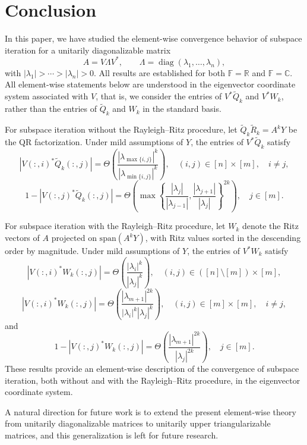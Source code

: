 \documentclass[11pt,a4paper]{article}
\theoremstyle{plain}              %
\theoremstyle{definition}         %
\begin{document}
\section{Conclusion}\label{section:conclusion}

In this paper, we have studied the element-wise convergence behavior of subspace iteration for a unitarily diagonalizable matrix
\[
A = V \Lambda V^*, \qquad \Lambda = \operatorname{diag}(\lambda_1,\dots,\lambda_n),
\]
with \(|\lambda_1| > \cdots > |\lambda_n| > 0\). All results are established for both \(\mathbb{F} = \mathbb{R}\) and \(\mathbb{F} = \mathbb{C}\). All element-wise statements below are understood in the eigenvector coordinate system associated with \(V\), that is, we consider the entries of \(V^*\tilde Q_k\) and \(V^*W_k\), rather than the entries of \(\tilde Q_k\) and \(W_k\) in the standard basis.

For subspace iteration without the Rayleigh--Ritz procedure, let \(\tilde Q_k \tilde R_k = A^k Y\) be the QR factorization. Under mild assumptions of \(Y\), the entries of \(V^*\tilde Q_k\) satisfy
\[
|V(:,i)^*\tilde Q_k(:,j)|=\Theta \left(\frac{|\lambda_{\max\{i,j\}}|^k}{|\lambda_{\min\{i,j\}}|^k}\right), \quad (i,j)\in[n]\times [m],\quad i\neq j,
\]
\[
1-|V(:,j)^*\tilde Q_k(:,j)|=\Theta\left( \max\left\{\frac{|\lambda_j|}{|\lambda_{j-1}|}, \frac{|\lambda_{j+1}|}{|\lambda_j|}\right\}^{2k}\right),\quad j\in[m].
\]

For subspace iteration with the Rayleigh--Ritz procedure, let \(W_k\) denote the Ritz vectors of \(A\) projected on \(\mathrm{span}(A^kY)\), with Ritz values sorted in the descending order by magnitude. Under mild assumptions of \(Y\), the entries of \(V^*W_k\) satisfy
\[
|V(:,i)^*W_k(:,j)|=\Theta \left(\frac{|\lambda_i|^k}{|\lambda_j|^k}\right),\quad (i,j)\in([n]\setminus[m])\times[m],
\]
\[
|V(:,i)^*W_k(:,j)|=\Theta \left(\frac{|\lambda_{m+1}|^{2k}}{|\lambda_i|^k|\lambda_j|^k}\right), \quad (i,j)\in[m]\times[m],\quad i\neq j,
\]
and
\[
1-|V(:,j)^*W_k(:,j)|=\Theta \left(\frac{|\lambda_{m+1}|^{2k}}{|\lambda_j|^{2k}}\right), \quad j\in[m].
\]
These results provide an element-wise description of the convergence of subspace iteration, both without and with the Rayleigh--Ritz procedure, in the eigenvector coordinate system.

A natural direction for future work is to extend the present element-wise theory from unitarily diagonalizable matrices to unitarily upper triangularizable matrices, and this generalization is left for future research.



\end{document}
